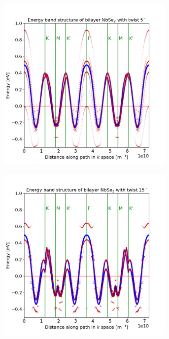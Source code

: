 \documentclass[12pt]{report} %
\begin{document}
\begin{figure}[t!]
\centering
  \begin{subfigure}[t]{0.45\textwidth}
    \centering
    \includegraphics[width=0.95\textwidth]{bilayer_bands_5_projected_low_E.png}
    \caption{}
    \label{bilayer_bands_5_projected_low_E}
  \end{subfigure}
  \hfill
  \begin{subfigure}[t]{0.45\textwidth}
    \centering
    \includegraphics[width=0.95\textwidth]{bilayer_bands_15_projected_low_E.png}
    \caption{
    }
    \label{bilayer_bands_15_projected_low_E}
  \end{subfigure}
  \caption{}
  \label{bilayer_bands_projected}
\end{figure}
\end{document}
